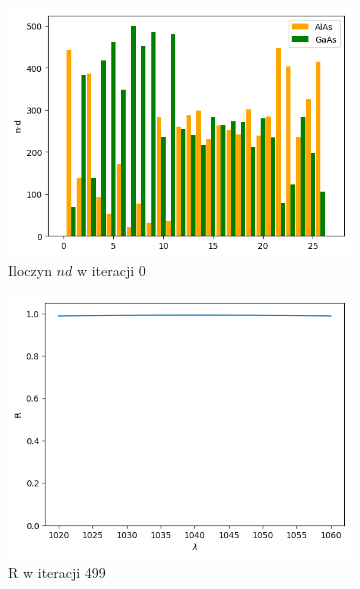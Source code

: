 \begin{figure} [ht!]
\begin{subfigure}[b]{0.32\textwidth}
        \includegraphics[width=\linewidth]{figures/wyniki/2stopien/dbr/result_ndresult0.png}
        \caption{Iloczyn $nd$ w iteracji 0}
    \end{subfigure}
        \begin{subfigure}[b]{0.30\textwidth}
        \includegraphics[width=\linewidth]{figures/wyniki/2stopien/dbr/result_Rresult499.png}
        \caption{R w iteracji 499}
    \end{subfigure}
        \begin{subfigure}[b]{0.31\textwidth}

\end{subfigure}
\end{figure}
